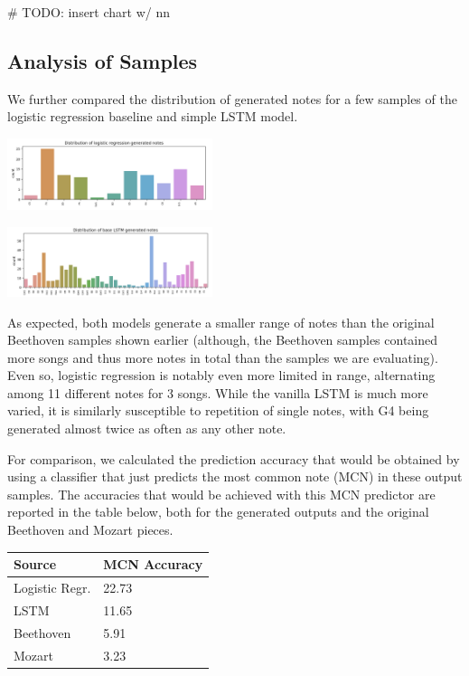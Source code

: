 \documentclass[twoside,twocolumn]{article}
\begin{document}
\# TODO: insert chart w/ nn 


\subsection{Analysis of Samples}
We further compared the distribution of generated notes for a few samples of the logistic regression baseline and simple LSTM model. 

\includegraphics[width = 0.45\textwidth]{images/logreg_notes.png}

\includegraphics[width = 0.45\textwidth]{images/simple_lstm_notes.png}

As expected, both models generate a smaller range of notes than the original Beethoven samples shown earlier (although, the Beethoven samples contained more songs and thus more notes in total than the samples we are evaluating). Even so, logistic regression is notably even more limited in range, alternating among 11 different notes for 3 songs. While the vanilla LSTM is much more varied, it is similarly susceptible to repetition of single notes, with G4 being generated almost twice as often as any other note. 

For comparison, we calculated the prediction accuracy that would be obtained by using a classifier that just predicts the most common note (MCN) in these output samples. The accuracies that would be achieved with this MCN predictor are reported in the table below, both for the generated outputs and the original Beethoven and Mozart pieces. \\

\begin{tabular}{|l|l|}
\hline
\textbf{Source} & \textbf{MCN Accuracy} \\ \hline
Logistic Regr.  & 22.73                 \\ \hline
LSTM            & 11.65                 \\ \hline
Beethoven       & 5.91                  \\ \hline
Mozart          & 3.23                  \\ \hline
\end{tabular} \\
\end{document}
